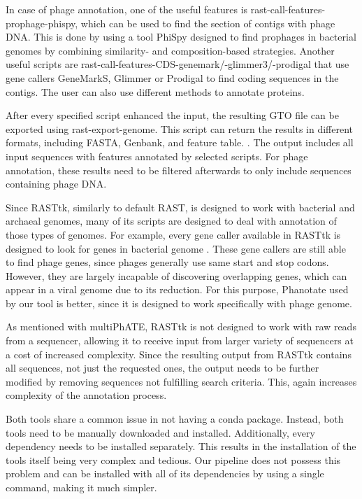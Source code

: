 In case of phage annotation, one of the useful features is rast-call-features-prophage-phispy, which can be used to find the section of contigs with phage DNA. This is done by using a tool PhiSpy designed to find prophages in bacterial genomes by combining similarity- and composition-based strategies. Another useful scripts are rast-call-features-CDS-genemark/-glimmer3/-prodigal that use gene callers GeneMarkS, Glimmer or Prodigal to find coding sequences in the contigs. The user can also use different methods to annotate proteins.

After every specified script enhanced the input, the resulting GTO file can be exported using rast-export-genome. This script can return the results in different formats, including FASTA, Genbank, and feature table. \cite{brettin2015rasttk}. The output includes all input sequences with features annotated by selected scripts. For phage annotation, these results need to be filtered afterwards to only include sequences containing phage DNA.

Since RASTtk, similarly to default RAST, is designed to work with bacterial and archaeal genomes, many of its scripts are designed to deal with annotation of those types of genomes. For example, every gene caller available in RASTtk is designed to look for genes in bacterial genome \cite{brettin2015rasttk}. These gene callers are still able to find phage genes, since phages generally use same start and stop codons. However, they are largely incapable of discovering overlapping genes, which can appear in a viral genome due to its reduction. For this purpose, Phanotate used by our tool is better, since it is designed to work specifically with phage genome.

As mentioned with multiPhATE, RASTtk is not designed to work with raw reads from a sequencer, allowing it to receive input from larger variety of sequencers at a cost of increased complexity. Since the resulting output from RASTtk contains all sequences, not just the requested ones, the output needs to be further modified by removing sequences not fulfilling search criteria. This, again increases complexity of the annotation process.

Both tools share a common issue in not having a conda package. Instead, both tools need to be manually downloaded and installed. Additionally, every dependency needs to be installed separately. This results in the installation of the tools itself being very complex and tedious. Our pipeline does not possess this problem and can be installed with all of its dependencies by using a single command, making it much simpler.